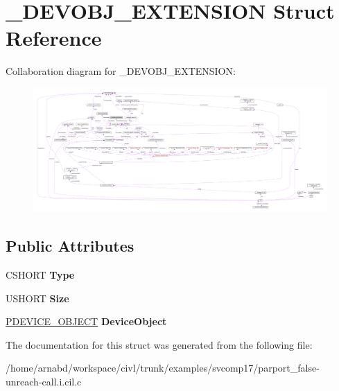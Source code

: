 \hypertarget{struct__DEVOBJ__EXTENSION}{}\section{\+\_\+\+D\+E\+V\+O\+B\+J\+\_\+\+E\+X\+T\+E\+N\+S\+I\+O\+N Struct Reference}
\label{struct__DEVOBJ__EXTENSION}


Collaboration diagram for \+\_\+\+D\+E\+V\+O\+B\+J\+\_\+\+E\+X\+T\+E\+N\+S\+I\+O\+N\+:
\nopagebreak
\begin{figure}[H]
\begin{center}
\leavevmode
\includegraphics[width=350pt]{struct__DEVOBJ__EXTENSION__coll__graph}
\end{center}
\end{figure}
\subsection*{Public Attributes}
\begin{DoxyCompactItemize}
\item 
\hypertarget{struct__DEVOBJ__EXTENSION_a5747c5322f65746a15a42968d49ab85e}{}C\+S\+H\+O\+R\+T {\bfseries Type}\label{struct__DEVOBJ__EXTENSION_a5747c5322f65746a15a42968d49ab85e}

\item 
\hypertarget{struct__DEVOBJ__EXTENSION_a0f11b861f7568f4902749c9b31beb823}{}U\+S\+H\+O\+R\+T {\bfseries Size}\label{struct__DEVOBJ__EXTENSION_a0f11b861f7568f4902749c9b31beb823}

\item 
\hypertarget{struct__DEVOBJ__EXTENSION_a3b003b96f1dc01c06d16b439b4eefff0}{}\hyperlink{struct__DEVICE__OBJECT}{P\+D\+E\+V\+I\+C\+E\+\_\+\+O\+B\+J\+E\+C\+T} {\bfseries Device\+Object}\label{struct__DEVOBJ__EXTENSION_a3b003b96f1dc01c06d16b439b4eefff0}

\end{DoxyCompactItemize}


The documentation for this struct was generated from the following file\+:\begin{DoxyCompactItemize}
\item 
/home/arnabd/workspace/civl/trunk/examples/svcomp17/parport\+\_\+false-\/unreach-\/call.\+i.\+cil.\+c\end{DoxyCompactItemize}
